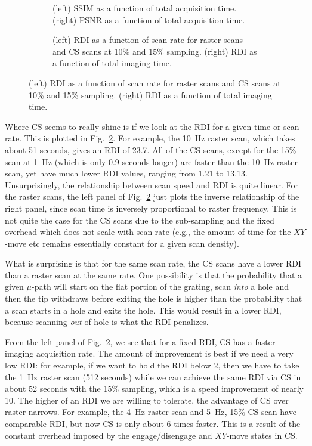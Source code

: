 \documentclass[twocolumn,twoside]{IEEEtran/IEEEtran}
\begin{document}
\begin{figure}[t!]
  \begin{subfigure}{1\textwidth}
    
    \caption{(left) SSIM as a function of total acquisition time. (right) PSNR
      as a function of total acquisition time.}
    \label{fig:time_ssim_psnr}
  \end{subfigure}
  
  \begin{subfigure}{1\textwidth}
    
    \caption{(left) RDI as a function of scan rate for raster scans and CS scans
      at 10\% and 15\% sampling. (right) RDI as a function of total imaging
      time.}
    \label{fig:time_damage}
  \end{subfigure}

  \label{fig:time_vs_metrics}
\end{figure}

Where CS seems to really shine is if we look at the RDI for a given time or scan
rate. This is plotted in Fig.~\ref{fig:time_damage}. For example, the 10~Hz
raster scan, which takes about 51 seconds, gives an RDI of 23.7. All of the CS
scans, except for the 15\% scan at 1~Hz (which is only 0.9 seconds longer) are
faster than the 10~Hz raster scan, yet have much lower RDI values, ranging from
1.21 to 13.13. Unsurprisingly, the relationship between scan speed and RDI is
quite linear. For the raster scans, the left panel of Fig.~\ref{fig:time_damage}
just plots the inverse relationship of the right panel, since scan time is
inversely proportional to raster frequency. This is not quite the case for the
CS scans due to the sub-sampling and the fixed overhead which does not scale
with scan rate (e.g., the amount of time for the $XY$-move etc remains
essentially constant for a given scan density).

What is surprising is that for the same scan rate, the CS scans have a lower RDI
than a raster scan at the same rate. One possibility is that the probability
that a given $\mu$-path will start on the flat portion of the grating, scan
\textit{into} a hole and then the tip withdraws before exiting the hole is
higher than the probability that a scan starts in a hole and exits the hole.
This would result in a lower RDI, because scanning \textit{out} of hole is what
the RDI penalizes.

From the left panel of Fig.~\ref{fig:time_damage}, we see that for a fixed RDI,
CS has a faster imaging acquisition rate. The amount of improvement is best if
we need a very low RDI: for example, if we want to hold the RDI below 2, then we
have to take the 1~Hz raster scan (512 seconds) while we can achieve the same
RDI via CS in about 52 seconds with the 15\% sampling, which is a speed
improvement of nearly 10. The higher of an RDI we are willing to tolerate, the
advantage of CS over raster narrows. For example, the 4~Hz raster scan and 5~Hz,
15\% CS scan have comparable RDI, but now CS is only about 6 times faster. This
is a result of the constant overhead imposed by the engage/disengage and
$XY$-move states in CS.
\end{document}
